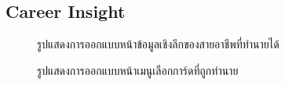 \subsection{Career Insight}
\begin{figure}[H]\centering
    \caption{รูปแสดงการออกแบบหน้าข้อมูลเชิงลึกของสายอาชีพที่ทำนายได้}\label{fig:CI.png}
\end{figure}
\begin{figure}[H]\centering
    \caption{รูปแสดงการออกแบบหน้าเมนูเลือกการ์ดที่ถูกทำนาย}\label{fig:CI-dropdown.png}
\end{figure}
